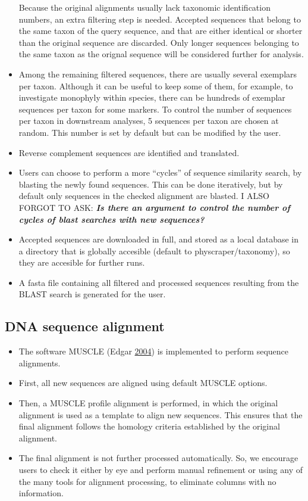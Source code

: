\documentclass[]{article}
\providecommand{\tightlist}{%
  \setlength{\itemsep}{0pt}\setlength{\parskip}{0pt}}
\begin{document}
\begin{itemize}
  Because the original alignments usually lack taxonomic identification numbers, an extra filtering
  step is needed. Accepted sequences that belong to the
  same taxon of the query sequence, and that are either identical or shorter than
  the original sequence are discarded. Only longer sequences belonging to the
  same taxon as the orignal sequence will be considered further for analysis.
\item
  Among the remaining filtered sequences, there are usually several exemplars per taxon.
  Although it can be useful to keep some of them, for example, to investigate monophyly
  within species, there can be hundreds of exemplar sequences per taxon for some markers.
  To control the number of sequences per taxon in downstream analyses,
  5 sequences per taxon are chosen at random. This number is set by default but can be modified by the user.
\item
  Reverse complement sequences are identified and translated.
\item
  Users can choose to perform a more ``cycles'' of sequence similarity search, by blasting the newly found sequences. This can be done iteratively, but by default only sequences in the checked alignment are blasted. I ALSO FORGOT TO ASK: \textbf{\emph{Is there an argument to control the number of cycles of blast searches with new sequences?}}
\item
  Accepted sequences are downloaded in full, and stored as a local database in a directory that is globally accesible (default to physcraper/taxonomy), so they are accesible for further runs.
\item
  A fasta file containing all filtered and processed sequences resulting from the BLAST search is generated for the user.
\end{itemize}

\hypertarget{dna-sequence-alignment}{%
\subsection{DNA sequence alignment}\label{dna-sequence-alignment}}

\begin{itemize}
\tightlist
\item
  The software MUSCLE (Edgar \protect\hyperlink{ref-edgar2004muscle}{2004}) is implemented to perform sequence alignments.
\item
  First, all new sequences are aligned using default MUSCLE options.
\item
  Then, a MUSCLE profile alignment is performed, in which the original alignment
  is used as a template to align new sequences. This ensures that the final alignment
  follows the homology criteria established by the original alignment.
\item
  The final alignment is not further processed automatically. So, we encourage users
  to check it either by eye and perform manual refinement or using any of the many
  tools for alignment processing, to eliminate columns with no information.
\end{itemize}
\end{document}
